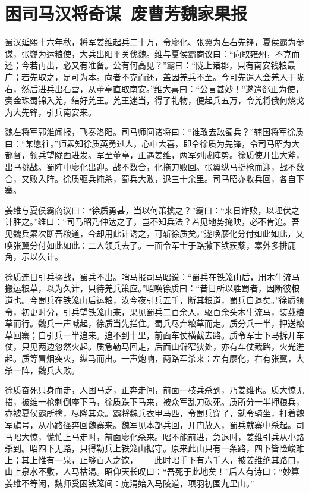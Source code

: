 \chapter{困司马汉将奇谋~废曹芳魏家果报}

蜀汉延熙十六年秋，将军姜维起兵二十万，令廖化、张翼为左右先锋，夏侯霸为参谋，张嶷为运粮使，大兵出阳平关伐魏。维与夏侯霸商议曰：“向取雍州，不克而还；今若再出，必又有准备。公有何高见？”霸曰：“陇上诸郡，只有南安钱粮最广；若先取之，足可为本。向者不克而还，盖因羌兵不至。今可先遣人会羌人于陇右，然后进兵出石营，从董亭直取南安。”维大喜曰：“公言甚妙！”遂遣郤正为使，赍金珠蜀锦入羌，结好羌王。羌王迷当，得了礼物，便起兵五万，令羌将俄何烧戈为大先锋，引兵南安来。

魏左将军郭淮闻报，飞奏洛阳。司马师问诸将曰：“谁敢去敌蜀兵？”辅国将军徐质曰：“某愿往。”师素知徐质英勇过人，心中大喜，即令徐质为先锋，令司马昭为大都督，领兵望陇西进发。军至董亭，正遇姜维，两军列成阵势。徐质使开出大斧，出马挑战。蜀阵中廖化出迎。战不数合，化拖刀败回。张翼纵马挺枪而迎，战不数合，又败入阵。徐质驱兵掩杀，蜀兵大败，退三十余里。司马昭亦收兵回，各自下寨。

姜维与夏侯霸商议曰：“徐质勇甚，当以何策擒之？”霸曰：“来日诈败，以埋伏之计胜之。”维曰：“司马昭乃仲达之子，岂不知兵法？若见地势掩映，必不肯追。吾见魏兵累次断吾粮道，今却用此计诱之，可斩徐质矣。”遂唤廖化分付如此如此，又唤张翼分付如此如此：二人领兵去了。一面令军士于路撒下铁蒺藜，寨外多排鹿角，示以久计。

徐质连日引兵搦战，蜀兵不出。哨马报司马昭说：“蜀兵在铁笼山后，用木牛流马搬运粮草，以为久计，只待羌兵策应。”昭唤徐质曰：“昔日所以胜蜀者，因断彼粮道也。今蜀兵在铁笼山后运粮，汝今夜引兵五千，断其粮道，蜀兵自退矣。”徐质领令，初更时分，引兵望铁笼山来，果见蜀兵二百余人，驱百余头木牛流马，装载粮草而行。魏兵一声喊起，徐质当先拦住。蜀兵尽弃粮草而走。质分兵一半，押送粮草回寨；自引兵一半追来。追不到十里，前面车仗横截去路。质令军士下马拆开车仗，只见两边忽然火起。质急勒马回走，后面山僻窄狭处，亦有车仗截路，火光迸起。质等冒烟突火，纵马而出。一声炮响，两路军杀来：左有廖化，右有张翼，大杀一阵，魏兵大败。

徐质奋死只身而走，人困马乏，正奔走间，前面一枝兵杀到，乃姜维也。质大惊无措，被维一枪刺倒座下马，徐质跌下马来，被众军乱刀砍死。质所分一半押粮兵，亦被夏侯霸所擒，尽降其众。霸将魏兵衣甲马匹，令蜀兵穿了，就令骑坐，打着魏军旗号，从小路径奔回魏寨来。魏军见本部兵回，开门放入，蜀兵就寨中杀起。司马昭大惊，慌忙上马走时，前面廖化杀来。昭不能前进，急退时，姜维引兵从小路杀到。昭四下无路，只得勒兵上铁笼山据守。原来此山只有一条路，四下皆险峻难上；其上惟有一泉，止够百人之饮，——此时昭手下有六千人，被姜维绝其路口，山上泉水不敷，人马枯渴。昭仰天长叹曰：“吾死于此地矣！”后人有诗曰：“妙算姜维不等闲，魏师受困铁笼间：庞涓始入马陵道，项羽初围九里山。”


